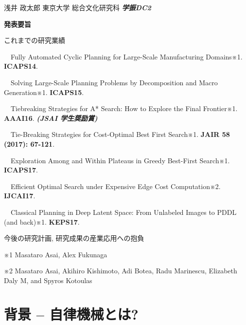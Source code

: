 \begin{outline-text-1}


\begin{center}
浅井 政太郎 東京大学 総合文化研究科 \textbf{\emph{学振DC2}}
\end{center}

\textbf{発表要旨}

これまでの研究業績

　Fully Automated Cyclic Planning for Large-Scale Manufacturing Domains※1. \textbf{ICAPS14}.

　Solving Large-Scale Planning Problems by Decomposition and Macro Generation※1. \textbf{ICAPS15}.

　Tiebreaking Strategies for A* Search: How to Explore the Final Frontier※1. \textbf{AAAI16}. \textbf{\emph{(JSAI 学生奨励賞)}}

　Tie-Breaking Strategies for Cost-Optimal Best First Search※1. \textbf{JAIR 58 (2017): 67-121}.

　Exploration Among and Within Plateaus in Greedy Best-First Search※1. \textbf{ICAPS17}.

　Efficient Optimal Search under Expensive Edge Cost Computation※2. \textbf{IJCAI17}.

　Classical Planning in Deep Latent Space: From Unlabeled Images to PDDL (and back)※1. \textbf{KEPS17}.

今後の研究計画, 研究成果の産業応用への抱負

\begin{smaller}
※1 Masataro Asai, Alex Fukunaga

※2 Masataro Asai, Akihiro Kishimoto, Adi Botea, Radu Marinescu, Elizabeth Daly M, and Spyros Kotoulas
\end{smaller}
\end{outline-text-1}

\section{背景 -- 自律機械とは?}
\label{sec:orgheadline19}

